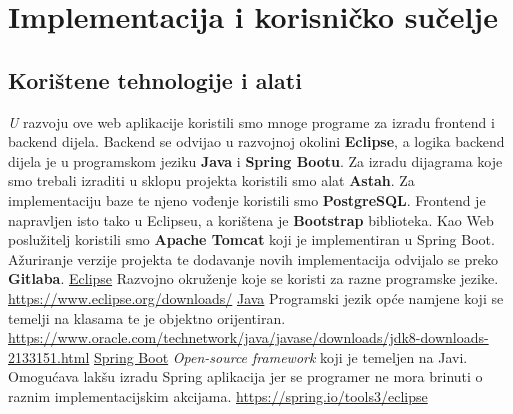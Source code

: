\chapter{Implementacija i korisničko sučelje}
		
		
		\section{Korištene tehnologije i alati}
			
			 \textit U razvoju ove web aplikacije koristili smo mnoge programe za izradu frontend i backend dijela. Backend se odvijao u razvojnoj okolini \textbf{Eclipse}, a logika backend dijela je u programskom jeziku \textbf{Java} i \textbf{Spring Bootu}.
			 \newline Za izradu dijagrama koje smo trebali izraditi u sklopu projekta koristili smo alat \textbf {Astah}. Za implementaciju baze te njeno vođenje koristili smo \textbf{PostgreSQL}.
			 \newline Frontend je napravljen isto tako u Eclipseu, a korištena je \textbf{Bootstrap} biblioteka. 
			 \newline Kao Web poslužitelj koristili smo \textbf{Apache Tomcat} koji je implementiran u Spring Boot.
			 Ažuriranje verzije projekta te dodavanje novih implementacija odvijalo se preko \textbf {Gitlaba}.
			 \newline
			 \newline
			 \noindent
			 \underline{Eclipse}
			 \newline
			 Razvojno okruženje koje se koristi za razne programske jezike.
			 \newline
			 \url{https://www.eclipse.org/downloads/}
			 \newline
			 \newline
			 \underline{Java}
			 \newline
			 Programski jezik opće namjene koji se temelji na klasama te je objektno orijentiran.
			 \newline
			 \url{https://www.oracle.com/technetwork/java/javase/downloads/jdk8-downloads-2133151.html}
			 \newline
			 \newline
			 \underline{Spring Boot}
			 \newline
			 \emph{Open-source framework} koji je temeljen na Javi. Omogućava lakšu izradu Spring aplikacija jer se programer ne mora brinuti o raznim implementacijskim akcijama.
			 \newline
			 \url{https://spring.io/tools3/eclipse}
